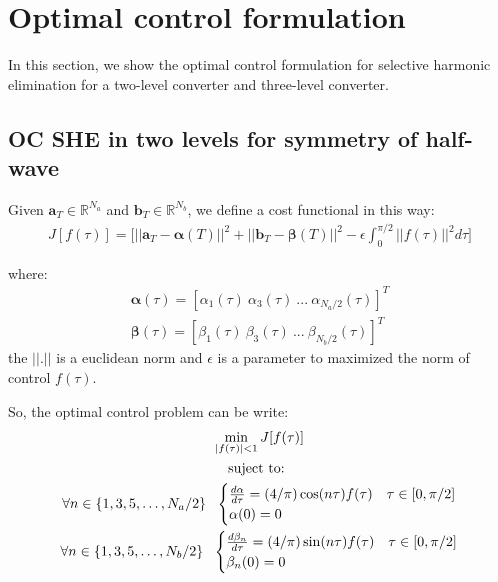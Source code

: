 
\section{Optimal control formulation}

In this section, we show the optimal control formulation for selective harmonic elimination for a two-level converter and three-level converter.

\subsection{OC SHE in two levels for symmetry of half-wave} 

\begin{problem}\label{OCP1}
    Given  $\bm{a}_T  \in \mathbb{R}^{N_a}$ and $\bm{b}_T  \in \mathbb{R}^{N_b}$, we define a cost functional in this way: 
        \begin{gather}
        J[f(\tau)] = \Bigg[ || \bm{a}_T - \bm{\alpha}(T)||^2 + || \bm{b}_T - \bm{\beta}(T)||^2 - \epsilon \int_0^{\pi/2} ||f(\tau)||^2 d\tau \Bigg] 
    \end{gather}

    where:
     \begin{gather}
        \bm{\alpha}(\tau) = [\alpha_1(\tau) \ \alpha_3(\tau)  \ ... \  \alpha_{N_a/2}(\tau) ]^T \\
        \bm{\beta}(\tau) = [\beta_1(\tau) \ \beta_3(\tau)  \ ... \  \beta_{N_b/2}(\tau) ]^T
     \end{gather}
     the $||.||$ is a euclidean norm and $\epsilon$ is a parameter to maximized the norm of control $f(\tau)$.
    \newline

    So, the optimal control problem can be write: 
    \begin{gather}
        \min_{|f(\tau) |<1} J[f(\tau)] \\
        \notag \text{suject to: } \\
        \notag \forall n \in \{1,3,5,\dots,N_a/2 \} \ \ 
        \begin{cases}
            \frac{d\alpha}{d\tau} = (4/\pi) \cos(n\tau) f(\tau) & \tau \in [0,\pi/2]\label{dyn}\\
            \alpha(0) = 0
        \end{cases} \\
        \notag \forall n \in \{1,3,5,\dots,N_b/2 \} \ \ 
        \begin{cases}
            \frac{d\beta_n}{d\tau} = (4/\pi) \sin(n\tau) f(\tau) & \tau \in [0,\pi/2]\label{dyn}\\
            \beta_n(0) = 0
        \end{cases} \\
    \end{gather}
\end{problem}


